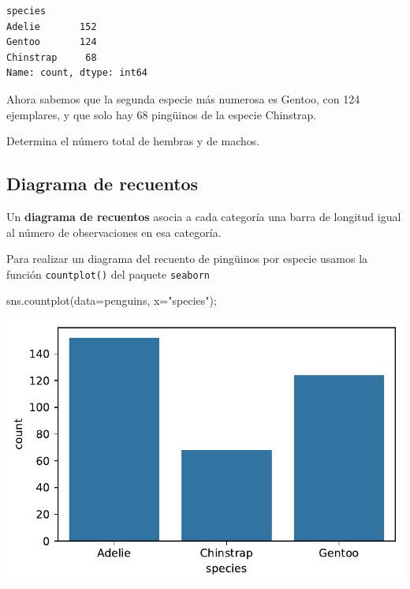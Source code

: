 \documentclass[
  a4paper,
  noprof,
  12pt,
  notoc,
  nosols,
  nobib]{mnye}
\newenvironment{Shaded}{\begin{snugshade}}{\end{snugshade}}
\newcommand{\NormalTok}[1]{\textcolor[rgb]{0.00,0.23,0.31}{#1}}
\newcommand{\OperatorTok}[1]{\textcolor[rgb]{0.37,0.37,0.37}{#1}}
\newcommand{\StringTok}[1]{\textcolor[rgb]{0.13,0.47,0.30}{#1}}
\renewenvironment{exercise}[1][]{
            \if\relax\detokenize{#1}\relax
                \ex
            \else
                \ex[note={#1}]
            \fi
        }{\endex}
\theoremstyle{definition}
\newtheorem{exercise}{Ejercicio}[section]
\theoremstyle{remark}
\begin{document}
\begin{verbatim}
species
Adelie       152
Gentoo       124
Chinstrap     68
Name: count, dtype: int64
\end{verbatim}

Ahora sabemos que la segunda especie más numerosa es Gentoo, con 124
ejemplares, y que solo hay 68 pingüinos de la especie Chinstrap.

\begin{exercise}[]%
\protect\hypertarget{exr-1categorial-sex-counts}{}\label{exr-1categorial-sex-counts}%
Determina el número total de hembras y de machos.

\end{exercise}

\subsection{Diagrama de recuentos}\label{diagrama-de-recuentos}

Un \textbf{diagrama de recuentos} asocia a cada categoría una barra de
longitud igual al número de observaciones en esa categoría.

Para realizar un diagrama del recuento de pingüinos por especie usamos
la función \texttt{countplot()} del paquete \texttt{seaborn}

\begin{Shaded}
\begin{Highlighting}[]
\NormalTok{sns.countplot(data}\OperatorTok{=}\NormalTok{penguins, x}\OperatorTok{=}\StringTok{"species"}\NormalTok{)}\OperatorTok{;}
\end{Highlighting}
\end{Shaded}

\includegraphics{chapters/1categorical_files/figure-pdf/cell-6-output-1.pdf}
\end{document}
